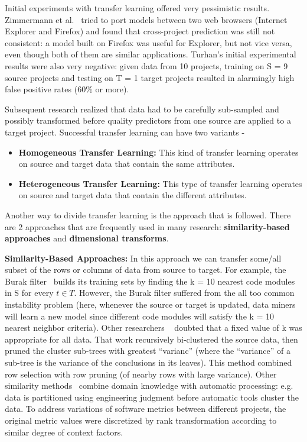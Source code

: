 \documentclass[10pt,journal,compsoc]{IEEEtran}
\newcommand{\bi}{\begin{itemize}}
\newcommand{\ei}{\end{itemize}}
\begin{document}
Initial experiments with transfer learning offered very pessimistic results. Zimmermann et al.~\cite{zimmermann2009cross} tried to port models between two web browsers (Internet Explorer and Firefox) and found that cross-project prediction was still not consistent: a model built on Firefox was useful for Explorer, but not vice versa, even though both of them are similar applications. Turhan's initial experimental results were also very negative: given data from 10 projects, training on S = 9 source projects and testing on T = 1 target projects resulted in alarmingly high false positive rates (60\% or more). 

Subsequent research realized that data had to be carefully sub-sampled and possibly transformed before quality predictors from one source are applied to a target project. Successful transfer learning can have two variants - 

\bi
\item
\textbf{Homogeneous Transfer Learning:} This kind of transfer learning operates on source and target data that contain the same attributes.
\item    
 \textbf{Heterogeneous Transfer Learning:} This type of transfer learning operates on source and target data that contain the different attributes.
\ei
Another way to divide transfer learning is the approach that is followed. There are  2 approaches that are frequently used in many research: {\bf similarity-based approaches} and {\bf dimensional transforms}.

 \textbf{Similarity-Based Approaches:} In this approach we can transfer some/all subset of the rows or columns of data from source to target. For example, the Burak filter~\cite{turhan09} builds its training sets by finding the k = 10 nearest code modules in S for every $ t \in T $. However, the Burak filter suffered from the all too common instability problem (here, whenever the source or target is updated, data miners will learn a new model since different code modules will satisfy the k = 10 nearest neighbor criteria). Other researchers ~\cite{kocaguneli2012, kocaguneli2011find} doubted that a fixed value of k was appropriate for all data. That work recursively bi-clustered the source data, then pruned the cluster sub-trees with greatest ``varianc'' (where the ``variance'' of a sub-tree is the variance of the conclusions in its leaves). This method combined row selection with row pruning (of nearby rows with large variance). Other similarity methods~\cite{Zhang16aa} combine domain knowledge with automatic processing: e.g. data is partitioned using engineering judgment before automatic tools cluster the data. To address variations of software metrics between different projects, the original metric values were discretized by rank transformation according to similar degree of context factors.
    
\end{document}
